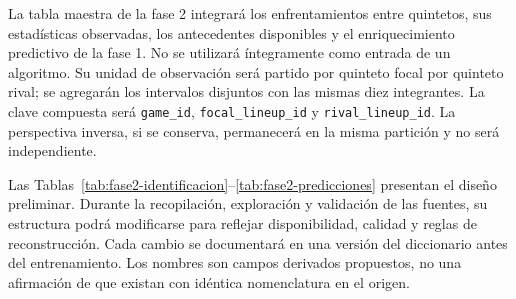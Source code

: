 La tabla maestra de la fase 2 integrará los enfrentamientos entre quintetos, sus estadísticas observadas, los antecedentes disponibles y el enriquecimiento predictivo de la fase 1. No se utilizará íntegramente como entrada de un algoritmo. Su unidad de observación será partido por quinteto focal por quinteto rival; se agregarán los intervalos disjuntos con las mismas diez integrantes. La clave compuesta será \texttt{game\_id}, \texttt{focal\_lineup\_id} y \texttt{rival\_lineup\_id}. La perspectiva inversa, si se conserva, permanecerá en la misma partición y no será independiente.

Las Tablas~\ref{tab:fase2-identificacion}--\ref{tab:fase2-predicciones} presentan el diseño preliminar. Durante la recopilación, exploración y validación de las fuentes, su estructura podrá modificarse para reflejar disponibilidad, calidad y reglas de reconstrucción. Cada cambio se documentará en una versión del diccionario antes del entrenamiento. Los nombres son campos derivados propuestos, no una afirmación de que existan con idéntica nomenclatura en el origen.

